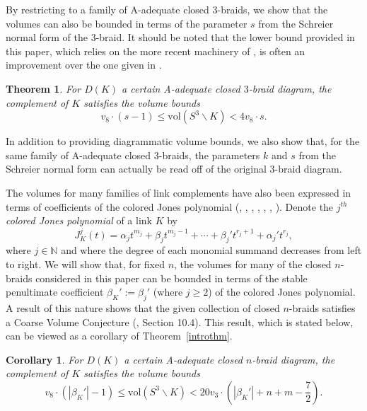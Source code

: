 \documentclass{article}
\newtheorem{theorem}{Theorem}[section]
\newtheorem{corollary}{Corollary}[section]
\begin{document}
By restricting to a family of A-adequate closed $3$-braids, we show that the volumes can also be bounded in terms of the parameter $s$ from the Schreier normal form of the $3$-braid. It should be noted that the lower bound provided in this paper, which relies on the more recent machinery of \cite{Guts}, is often an improvement over the one given in \cite{Cusp}.  

\begin{theorem}\label{sthm}
For $D(K)$ a certain A-adequate closed $3$-braid diagram, the complement of $K$ satisfies the volume bounds
$$v_{8}\cdot(s-1) \leq \mathrm{vol}(S^{3}\backslash K) < 4v_{8}\cdot s.$$
\end{theorem}

In addition to providing diagrammatic volume bounds, we also show that, for the same family of A-adequate closed 3-braids, the parameters $k$ and $s$ from the Schreier normal form can actually be read off of the original 3-braid diagram. 

The volumes for many families of link complements have also been expressed in terms of coefficients of the colored Jones polynomial (\cite{Volumish}, \cite{Refined}, \cite{Guts}, \cite{Filling}, \cite{Symmetric}, \cite{Cusp}, \cite{Stoimenow}). Denote the \emph{$j^{th}$ colored Jones polynomial} of a link $K$ by
$$J_{K}^{j}(t)=\alpha_{j}t^{m_{j}}+\beta_{j}t^{m_{j}-1}+\cdots+\beta_{j}'t^{r_{j}+1}+\alpha_{j}'t^{r_{j}},$$
\noindent where $j \in \mathbb{N}$ and where the degree of each monomial summand decreases from left to right. We will show that, for fixed $n$, the volumes for many of the closed $n$-braids considered in this paper can be bounded in terms of the stable penultimate coefficient $\beta_{K}':=\beta_{j}'$ (where $j \geq 2$) of the colored Jones polynomial. A result of this nature shows that the given collection of closed $n$-braids satisfies a Coarse Volume Conjecture (\cite{Guts}, Section 10.4). This result, which is stated below, can be viewed as a corollary of Theorem~\ref{introthm}.  

\begin{corollary}\label{newcor} 
For $D(K)$ a certain A-adequate closed $n$-braid diagram, the complement of $K$ satisfies the volume bounds
$$v_{8}\cdot(\left|\beta_{K}'\right|-1) \leq \mathrm{vol}(S^{3}\backslash K) < 20v_{3}\cdot\left(\left|\beta_{K}'\right|+n+m-\dfrac{7}{2}\right).$$
\end{corollary}
\end{document}
